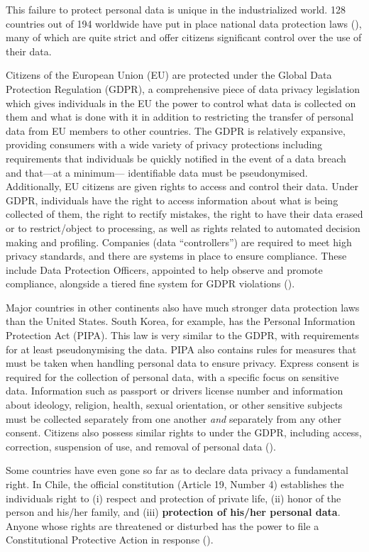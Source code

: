 \documentclass[water,article,submit,moreauthors,pdftex]{mdpi}
\begin{document}
This failure to protect personal data is unique in the industrialized
world. 128 countries out of 194 worldwide have put in place national
data protection laws (\citet{unctad}), many of which are quite strict
and offer citizens significant control over the use of their data.

Citizens of the European Union (EU) are protected under the Global Data
Protection Regulation (GDPR), a comprehensive piece of data privacy
legislation which gives individuals in the EU the power to control what
data is collected on them and what is done with it in addition to
restricting the transfer of personal data from EU members to other
countries. The GDPR is relatively expansive, providing consumers with a
wide variety of privacy protections including requirements that
individuals be quickly notified in the event of a data breach and
that---at a minimum--- identifiable data must be pseudonymised.
Additionally, EU citizens are given rights to access and control their
data. Under GDPR, individuals have the right to access information about
what is being collected of them, the right to rectify mistakes, the
right to have their data erased or to restrict/object to processing, as
well as rights related to automated decision making and profiling.
Companies (data ``controllers'') are required to meet high privacy
standards, and there are systems in place to ensure compliance. These
include Data Protection Officers, appointed to help observe and promote
compliance, alongside a tiered fine system for GDPR violations
(\citet{GDPR-text}).

Major countries in other continents also have much stronger data
protection laws than the United States. South Korea, for example, has
the Personal Information Protection Act (PIPA). This law is very similar
to the GDPR, with requirements for at least pseudonymising the data.
PIPA also contains rules for measures that must be taken when handling
personal data to ensure privacy. Express consent is required for the
collection of personal data, with a specific focus on sensitive data.
Information such as passport or drivers license number and information
about ideology, religion, health, sexual orientation, or other sensitive
subjects must be collected separately from one another \emph{and}
separately from any other consent. Citizens also possess similar rights
to under the GDPR, including access, correction, suspension of use, and
removal of personal data (\citet{data-guidance}).

Some countries have even gone so far as to declare data privacy a
fundamental right. In Chile, the official constitution (Article 19,
Number 4) establishes the individuals right to (i) respect and
protection of private life, (ii) honor of the person and his/her family,
and (iii) \textbf{protection of his/her personal data}. Anyone whose
rights are threatened or disturbed has the power to file a
Constitutional Protective Action in response (\citet{chile}).
\end{document}
